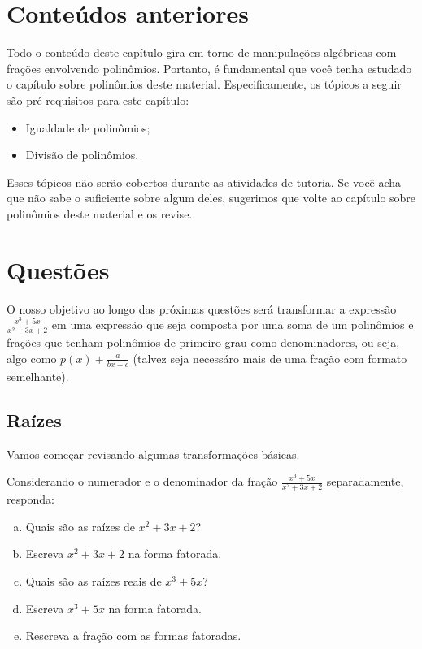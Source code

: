 \documentclass[main_estudante.tex]{subfiles}
\begin{document}
\section{Conteúdos anteriores}

Todo o conteúdo deste capítulo gira em torno de manipulações algébricas com frações envolvendo polinômios. Portanto, é fundamental que você tenha estudado o capítulo sobre polinômios deste material. Especificamente, os tópicos a seguir são pré-requisitos para este capítulo:
\begin{itemize}
 \item Igualdade de polinômios;
 \item Divisão de polinômios.
\end{itemize}

Esses tópicos não serão cobertos durante as atividades de tutoria. Se você acha que não sabe o suficiente sobre algum deles, sugerimos que volte ao capítulo sobre polinômios deste material e os revise.

\newpage

\section{Questões}

O nosso objetivo ao longo das próximas questões será transformar a expressão $\frac{x^3+5x}{x^2+3x+2}$ em uma expressão que seja composta por uma soma de um polinômios e frações que tenham polinômios de primeiro grau como denominadores, ou seja, algo como $p(x)+\frac{a}{bx+c}$ (talvez seja necessáro mais de uma fração com formato semelhante).

\subsection*{Raízes}

Vamos começar revisando algumas transformações básicas.

\begin{questao}
Considerando o numerador e o denominador da fração $\frac{x^3+5x}{x^2+3x+2}$ separadamente, responda:
\begin{enumerate}[a)]
\item Quais são as raízes de $x^2+3x+2$?
\item Escreva $x^2+3x+2$ na forma fatorada.
\item Quais são as raízes reais de $x^3+5x$?
\item Escreva $x^3+5x$ na forma fatorada.
\item Rescreva a fração com as formas fatoradas.
\end{enumerate}
\end{questao}
\end{document}
